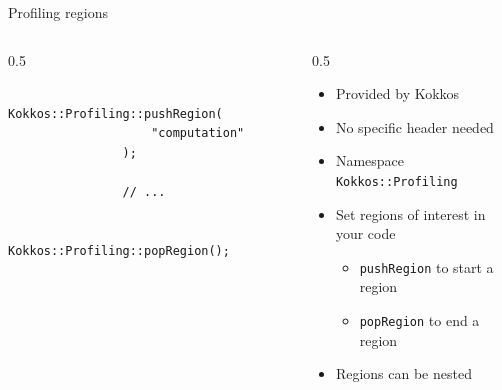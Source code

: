 \documentclass[
    aspectratio=169,
]{beamer}
\begin{document}
\begin{frame}[fragile]{Profiling regions}
    \begin{columns}
        \begin{column}{0.5\linewidth}
            \begin{verbatim}
                Kokkos::Profiling::pushRegion(
                    "computation"
                );

                // ...

                Kokkos::Profiling::popRegion();
            \end{verbatim}
        \end{column}
        \begin{column}{0.5\linewidth}
            \begin{itemize}
                \item Provided by Kokkos
                \item No specific header needed
                \item Namespace \texttt{Kokkos::Profiling}
                \item Set regions of interest in your code
                \begin{itemize}
                    \item \texttt{pushRegion} to start a region
                    \item \texttt{popRegion} to end a region
                \end{itemize}
                \item Regions can be nested
            \end{itemize}
        \end{column}
    \end{columns}
\end{frame}
\end{document}

